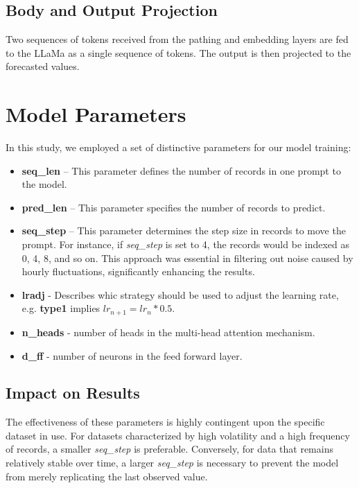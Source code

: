 \subsection{Body and Output Projection}
Two sequences of tokens received from the pathing and embedding layers are fed to the LLaMa as a single sequence of tokens. The output is then projected to the forecasted values. \\

\section{Model Parameters}

In this study, we employed a set of distinctive parameters for our model training:

\begin{itemize}
	\item \textbf{seq\_len} – This parameter defines the number of records in one prompt to the model.
	\item \textbf{pred\_len} – This parameter specifies the number of records to predict.
	\item \textbf{seq\_step} – This parameter determines the step size in records to move the prompt. For instance, if \textit{seq\_step} is set to 4, the records would be indexed as 0, 4, 8, and so on. This approach was essential in filtering out noise caused by hourly fluctuations, significantly enhancing the results.
	\item \textbf{lradj} - Describes whic strategy should be used to adjust the learning rate, e.g. \textbf{type1} implies $lr_{n+1} = lr_{n} * 0.5$.
	\item \textbf{n\_heads} - number of heads in the multi-head attention mechanism.
	\item \textbf{d\_ff} - number of neurons in the feed forward layer.
\end{itemize}

\subsection{Impact on Results}
The effectiveness of these parameters is highly contingent upon the specific dataset in use. For datasets characterized by high volatility and a high frequency of records, a smaller \textit{seq\_step} is preferable. Conversely, for data that remains relatively stable over time, a larger \textit{seq\_step} is necessary to prevent the model from merely replicating the last observed value.


